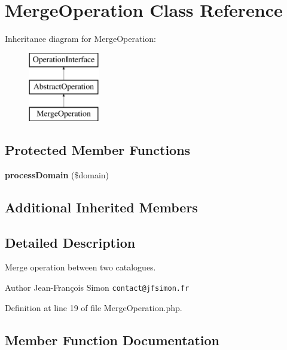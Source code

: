 \section{Merge\+Operation Class Reference}
\label{class_symfony_1_1_component_1_1_translation_1_1_catalogue_1_1_merge_operation}
Inheritance diagram for Merge\+Operation\+:\begin{figure}[H]
\begin{center}
\leavevmode
\includegraphics[height=3.000000cm]{class_symfony_1_1_component_1_1_translation_1_1_catalogue_1_1_merge_operation}
\end{center}
\end{figure}
\subsection*{Protected Member Functions}
\begin{DoxyCompactItemize}
\item 
{\bf process\+Domain} (\$domain)
\end{DoxyCompactItemize}
\subsection*{Additional Inherited Members}


\subsection{Detailed Description}
Merge operation between two catalogues.

\begin{DoxyAuthor}{Author}
Jean-\/\+François Simon {\tt contact@jfsimon.\+fr} 
\end{DoxyAuthor}


Definition at line 19 of file Merge\+Operation.\+php.



\subsection{Member Function Documentation}

